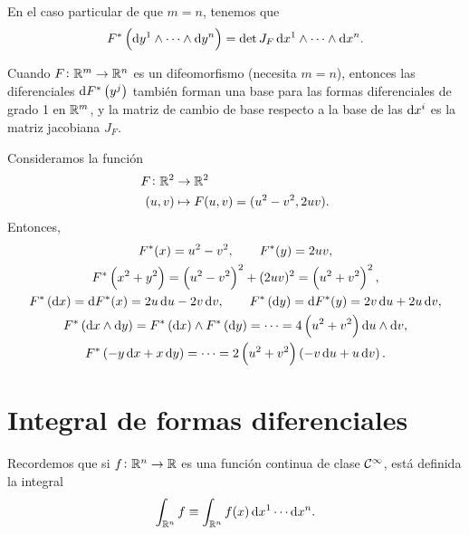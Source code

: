 \begin{obs}
    En el caso particular de que $m=n$, tenemos que
    \[
        F^\ast \left( \dif y^1 \wedge \cdots \wedge \dif y^n \right) = \det J_F \dif x^1 \wedge \cdots \wedge \dif x^n.
    \]
\end{obs}

\begin{prop}
    Cuando $F \colon \mathbb{R}^m \to \mathbb{R}^n$ es un difeomorfismo (necesita $m=n$), entonces las diferenciales $\dif F^\ast \left( y^j \right)$
    tambi\'en forman una base para las formas diferenciales de grado 1 en $\mathbb{R}^m$, y la matriz de cambio de base respecto a la base de las
    $\dif x^i$ es la matriz jacobiana $J_F$.
\end{prop}

\begin{example*}
    Consideramos la función
    \[
        \begin{aligned}
            F \colon \mathbb{R}^2 &\to \mathbb{R}^2 \\
            (u,v) &\mapsto F(u,v) = (u^2 - v^2, 2uv).
        \end{aligned}
    \]
    Entonces,
    \begin{gather*}
        F^\ast(x) = u^2 - v^2, \qquad F^\ast(y) = 2uv, \\
        F^\ast \left( x^2 + y^2 \right) = \left(u^2 - v^2\right)^2 + (2uv)^2 = \left(u^2 +v^2\right)^2, \\
        F^\ast\left( \dif x \right) = \dif F^\ast(x) = 2u\dif u - 2v\dif v,
        \qquad
        F^\ast\left( \dif y \right) = \dif F^\ast (y) = 2v \dif u + 2u \dif v, \\
        F^\ast\left( \dif x \wedge \dif y \right) = F^\ast\left( \dif x \right) \wedge F^\ast\left( \dif y \right) = \cdots =
        4 \left( u^2 + v^2 \right) \dif u \wedge \dif v, \\
        F^\ast\left( -y\dif x + x \dif y\right) = \cdots = 2 \left( u^2 + v^2 \right) \left( -v \dif u + u \dif v \right).
    \end{gather*}
\end{example*}

\section{Integral de formas diferenciales}

\begin{obs}
    Recordemos que si $f \colon \mathbb{R}^n \to \mathbb{R}$ es una función continua de clase $\mathcal{C}^\infty$, está definida la integral
    \[
        \int_{\real^n} f \equiv \int_{\real^n} f(x) \dif x^1 \cdots \dif x^n.
    \]
\end{obs}


